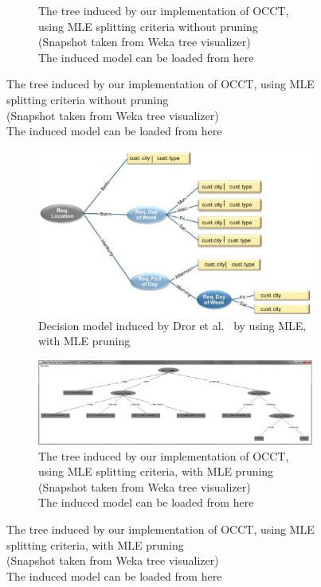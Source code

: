 \documentclass[a4paper,12pt]{article}
\begin{document}
\begin{spacing}{1.5}
\begin{figure}[!h]
\begin{subfigure}{\linewidth}
        \caption{The tree induced by our implementation of OCCT, using MLE splitting criteria without pruning\\ (Snapshot taken from Weka tree visualizer)\\The induced model can be loaded from here }\label{fig:ourMLEnoP}
    \end{subfigure}
\end{figure}
\pagebreak
\begin{figure}[!h]
    \centering
    \begin{subfigure}{\linewidth}
        \vspace*{1cm}
        \includegraphics[width=1\textwidth]{Figures/Eval/PDF/MaayanMLEwP.pdf}
        \caption{Decision model induced by Dror et al.~\cite{dror2011thesis} by using MLE, with MLE pruning}\label{fig:originalMLEwP}
        \vspace*{3cm}
    \end{subfigure}
    \begin{subfigure}{1\textwidth}
        \centering        
        \includegraphics[width=1\textwidth]{Figures/Eval/PDF/OurMLEwP.pdf}
        \caption{The tree induced by our implementation of OCCT, using MLE splitting criteria, with MLE pruning\\ (Snapshot taken from Weka tree visualizer)\\The induced model can be loaded from here }\label{fig:ourMLEwP}
    \end{subfigure}
\end{figure}
\pagebreak

\end{spacing}
\end{document}
